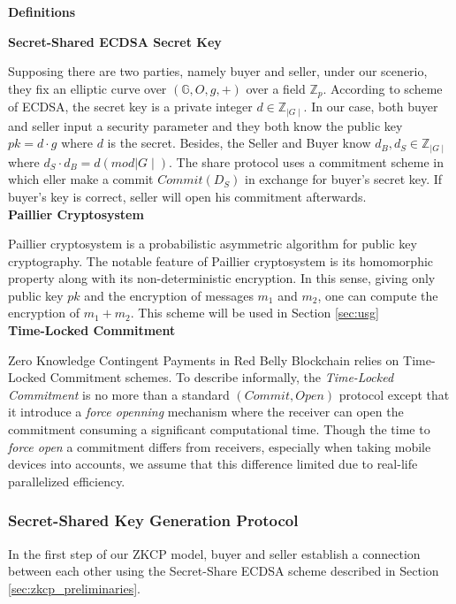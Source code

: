 \documentclass[12pt]{article}
\begin{document}
\textbf{Definitions\\}

\textbf{Secret-Shared ECDSA Secret Key}

Supposing there are two parties, namely buyer and seller, under our scenerio, they fix an elliptic curve over $(\mathbb{G},O,g,+)$ over a field ${\mathbb{Z}_p}$. According to scheme of ECDSA, the secret key is a private integer $d\in{\mathbb{Z}_{\mid G \mid}}$. In our case, both buyer and seller input a security parameter and they both know the public key $pk = d \cdot g$ where $d$ is the secret. Besides, the Seller and Buyer know ${d_B}, {d_S} \in {\mathbb{Z}_{\mid G \mid}}$ where ${d_S} \cdot {d_B} = d (mod {\mid G \mid})$.  The share protocol uses a commitment scheme in which eller make a commit $Commit({D_S})$ in exchange for buyer's secret key. If buyer's key is correct, seller will open his commitment afterwards. \\

\textbf{Paillier Cryptosystem}

Paillier cryptosystem is a probabilistic asymmetric algorithm for public key cryptography. The notable feature of Paillier cryptosystem is its homomorphic property along with its non-deterministic encryption. In this sense, giving only public key $pk$ and the encryption of messages ${m_1}$ and ${m_2}$, one can compute the encryption of ${m_1}+{m_2}$. This scheme will be used in Section \ref{sec:usg}\\

\textbf{Time-Locked Commitment}

Zero Knowledge Contingent Payments in Red Belly Blockchain relies on Time-Locked Commitment schemes. To describe informally, the \textit{Time-Locked Commitment} is no more than a standard $(Commit, Open)$ protocol except that it introduce a \textit{force openning} mechanism where the receiver can open the commitment consuming a significant computational time. Though the time to \textit{force open} a commitment differs from receivers, especially when taking mobile devices into accounts, we assume that this difference limited due to real-life parallelized efficiency.


\subsubsection{Secret-Shared Key Generation Protocol}

In the first step of our ZKCP model, buyer and seller establish a connection between each other using the Secret-Share ECDSA scheme described in Section \ref{sec:zkcp_preliminaries}. 
\end{document}
